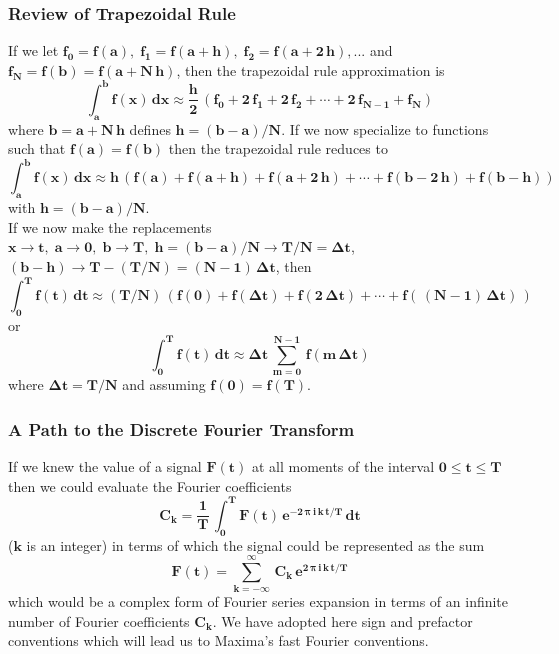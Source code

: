 \documentclass[11pt]{article}
\begin{document}
\subsubsection*{Review of Trapezoidal Rule}
If we let $\mathbf{f_{0} = f(a),\; f_{1} = f(a + h),\; f_{2} = f(a + 2\,h),...}$
  and $\mathbf{f_{N} = f(b) = f(a + N\,h)}$, then the trapezoidal rule approximation
  is
\begin{equation}
\mathbf{\int_{a}^{b} f(x)\,dx \approx \frac{h}{2}\,(f_{0} + 2\,f_{1} + 2\,f_{2} + \cdots  + 2\,f_{N-1} + f_{N})}
\end{equation}
where $\mathbf{b = a + N\,h}$ defines $\mathbf{h = (b-a)/N}$.
If we now specialize to functions such that $\mathbf{f(a) = f(b)}$ then the trapezoidal
  rule reduces to
\begin{equation}
\mathbf{\int_{a}^{b} f(x)\,dx \approx h\,\left(f(a) + f(a+h) + f(a+2\,h) + \cdots + f(b- 2\,h) + f(b-h)\right)}
\end{equation}
with $\mathbf{h = (b-a)/N}$.\\

\noindent If we now make the replacements $\mathbf{x \rightarrow t,\;a \rightarrow 0,\;
         b \rightarrow T,\; h = (b-a)/N \rightarrow T/N = \boldsymbol{\Delta}t}$,\\
		 $\mathbf{(b-h) \rightarrow T - (T/N) = (N-1)\,\boldsymbol{\Delta}t}$, then
\begin{equation}
\mathbf{\int_{0}^{T} f(t)\,dt \approx (T/N)\,\left(f(0) + f(\boldsymbol{\Delta}t) +
         f(2\,\boldsymbol{\Delta}t) + \cdots + f(\,(N-1)\,\boldsymbol{\Delta}t) \,\right) }
\end{equation}
or
\begin{equation} \label{Eq:trap}
\mathbf{\int_{0}^{T} f(t)\,dt \approx \boldsymbol{\Delta}t \, \sum_{m=0}^{N-1}\,f(m\,\boldsymbol{\Delta}t) }
\end{equation}
where $\mathbf{\boldsymbol{\Delta}t = T/N}$ and assuming $\mathbf{f(0) = f(T)}$.
\subsubsection*{A Path to the Discrete Fourier Transform}
If we knew the value of a signal $\mathbf{F(t)}$ at all moments of the interval
  $\mathbf{0 \leq t \leq T}$ then we could evaluate the Fourier coefficients
\begin{equation}  \label{Eq:cont}
\mathbf{C_{k} = \frac{1}{T}\,\int_{0}^{T} F(t)\,e^{- 2\,\boldsymbol{\pi}\,i\,k\,t/T}\,dt }
\end{equation}
  ($\mathbf{k}$ is an integer) in terms of which the signal could be represented as the sum
\begin{equation}
\mathbf{F(t) = \sum_{k = -\infty}^{\infty}\,C_{k} \,e^{2\,\boldsymbol{\pi}\,i\,k\,t/T} }
\end{equation}
  which would be a complex form of Fourier series expansion in terms of an infinite number
  of Fourier coefficients $\mathbf{C_{k}}$.
We have adopted here sign and prefactor conventions which will lead us to Maxima's fast
  Fourier conventions.\\
  
\end{document}
